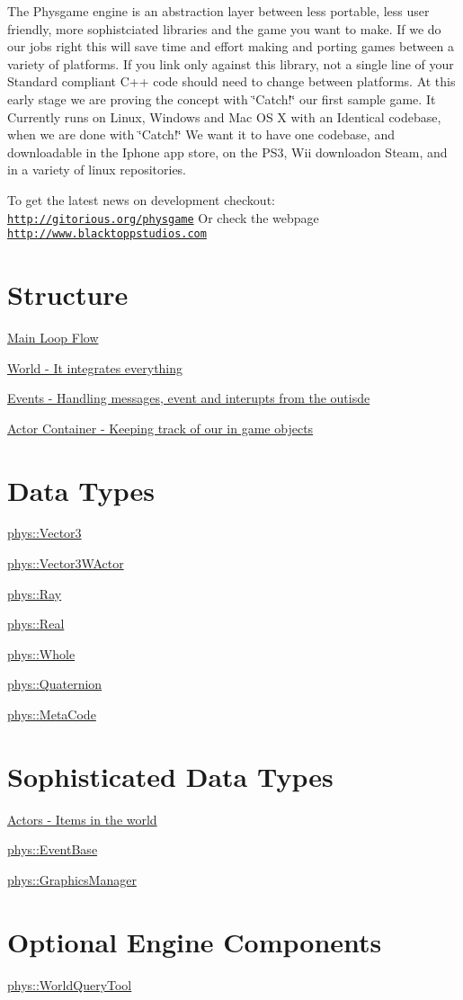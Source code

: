 The Physgame engine is an abstraction layer between less portable, less user friendly, more sophistciated libraries and the game you want to make. If we do our jobs right this will save time and effort making and porting games between a variety of platforms. If you link only against this library, not a single line of your Standard compliant C++ code should need to change between platforms. At this early stage we are proving the concept with \char`\"{}Catch!\char`\"{} our first sample game. It Currently runs on Linux, Windows and Mac OS X with an Identical codebase, when we are done with \char`\"{}Catch!\char`\"{} We want it to have one codebase, and downloadable in the Iphone app store, on the PS3, Wii downloadon Steam, and in a variety of linux repositories.

To get the latest news on development checkout: \href{http://gitorious.org/physgame}{\tt http://gitorious.org/physgame} Or check the webpage \href{http://www.blacktoppstudios.com}{\tt http://www.blacktoppstudios.com}\hypertarget{index_Engine}{}\section{Structure}\label{index_Engine}
\hyperlink{mainloop1}{Main Loop Flow}

\hyperlink{classphys_1_1World}{World -\/ It integrates everything}

\hyperlink{classphys_1_1EventManager}{Events -\/ Handling messages, event and interupts from the outisde}

\hyperlink{actorcontainer1}{Actor Container -\/ Keeping track of our in game objects}\hypertarget{index_Types}{}\section{Data Types}\label{index_Types}
\hyperlink{classphys_1_1Vector3}{phys::Vector3}

\hyperlink{classphys_1_1Vector3WActor}{phys::Vector3WActor}

\hyperlink{classphys_1_1Ray}{phys::Ray}

\hyperlink{namespacephys_af7eb897198d265b8e868f45240230d5f}{phys::Real}

\hyperlink{namespacephys_a460f6bc24c8dd347b05e0366ae34f34a}{phys::Whole}

\hyperlink{classphys_1_1Quaternion}{phys::Quaternion}

\hyperlink{classphys_1_1MetaCode}{phys::MetaCode}\hypertarget{index_Classes}{}\section{Sophisticated Data Types}\label{index_Classes}
\hyperlink{classphys_1_1ActorBase}{Actors -\/ Items in the world}

\hyperlink{classphys_1_1EventBase}{phys::EventBase}

\hyperlink{classphys_1_1GraphicsManager}{phys::GraphicsManager}\hypertarget{index_Optional}{}\section{Optional Engine Components}\label{index_Optional}
\hyperlink{classphys_1_1WorldQueryTool}{phys::WorldQueryTool} 